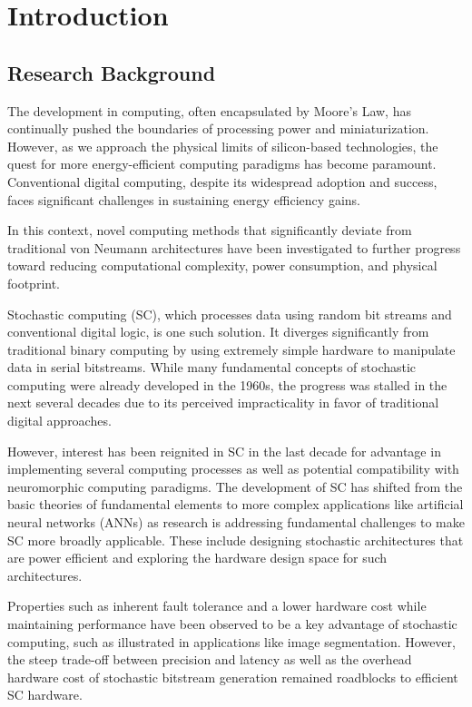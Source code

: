 %
\chapter{Introduction}
\label{sec:intro}

\section{Research Background}
\label{sec:intro:bg}

The development in computing, often encapsulated by Moore's Law, has continually pushed the boundaries of processing power and miniaturization. However, as we approach the physical limits of silicon-based technologies, the quest for more energy-efficient computing paradigms has become paramount. Conventional digital computing, despite its widespread adoption and success, faces significant challenges in sustaining energy efficiency gains.

In this context, novel computing methods that significantly deviate from traditional von Neumann architectures have been investigated to further progress toward reducing computational complexity, power consumption, and physical footprint.

Stochastic computing (SC), which processes data using random bit streams and conventional digital logic, is one such solution. It diverges significantly from traditional binary computing by using extremely simple hardware to manipulate data in serial bitstreams. While many fundamental concepts of stochastic computing were already developed in the 1960s, the progress was stalled in the next several decades due to its perceived impracticality in favor of traditional digital approaches. 

However, interest has been reignited in SC in the last decade for advantage in implementing several computing processes as well as potential compatibility with neuromorphic computing paradigms. The development of SC has shifted from the basic theories of fundamental elements to more complex applications like artificial neural networks (ANNs) as research is addressing fundamental challenges to make SC more broadly applicable. These include designing stochastic architectures that are power efficient and exploring the hardware design space for such architectures.

Properties such as inherent fault tolerance and a lower hardware cost while maintaining performance have been observed to be a key advantage of stochastic computing, such as illustrated in applications like image segmentation. However, the steep trade-off between precision and latency as well as the overhead hardware cost of stochastic bitstream generation remained roadblocks to efficient SC hardware. 

